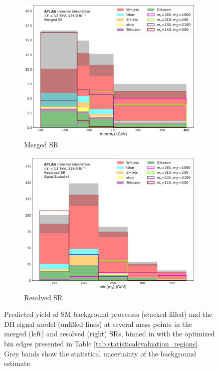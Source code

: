 \begin{figure}[htbp]
  \centering
    \begin{subfigure}[t]{0.48\textwidth}
    \centering
     \includegraphics[width = 0.99\textwidth]{Figures/7/SR1L_Merged_fit/TARJets10_minmS_mgd.pdf}
    \caption{Merged SR}
    \end{subfigure}
    \begin{subfigure}[t]{0.48\textwidth}
    \centering
     \includegraphics[width = 0.99\textwidth]{Figures/7/SR1L_Resolved_fit/TARJets10_minmS_res.pdf}
     \caption{Resolved SR}
    \end{subfigure}
    \caption{Predicted yield of SM background processes (stacked filled) and the DH signal model (unfilled lines) at several mass points in the merged (left) and resolved (right) SRs, binned in \minms with the optimized bin edges presented in Table \ref{tab:statisticalevaluation_regions}. Grey bands show the statistical uncertainty of the background estimate.}
   \label{fig:minms_binning}
\end{figure}


